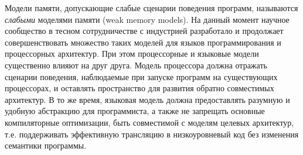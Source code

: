Модели памяти, допускающие слабые сценарии поведения программ, называются \emph{слабыми} моделями памяти (weak memory models).
На данный момент научное сообщество в тесном сотрудничестве с индустрией
разработало и продолжает совершенствовать множество таких моделей для
языков программирования и процессорных архитектур.
При этом процессорные и языковые модели существенно влияют на друг друга.
Модель процессора должна отражать сценарии поведения, наблюдаемые при запуске программ
на существующих процессорах, и оставлять пространство для развития
обратно совместимых архитектур. В то же время, языковая модель должна
предоставлять разумную и удобную абстракцию для программиста, а также не запрещать основные
компиляторные оптимизации, быть совместимой с моделям целевых архитектур,
т.е. поддерживать эффективную трансляцию в низкоуровневый код без изменения
семантики программы.



